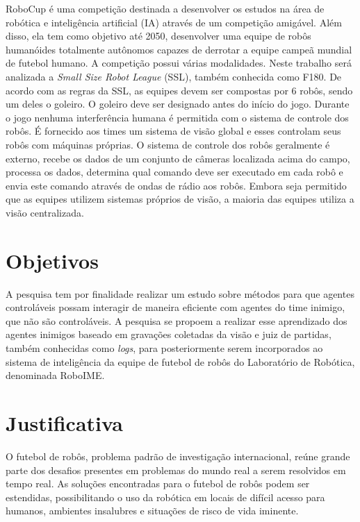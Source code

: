 RoboCup é uma competição destinada a desenvolver os estudos na área de robótica e
inteligência artificial (IA) através de um competição amigável. Além disso, ela tem
como objetivo até 2050, desenvolver uma equipe de robôs humanóides totalmente
autônomos capazes de derrotar a equipe campeã mundial de futebol humano. A competição
possui várias modalidades. Neste trabalho será analizada a \textit{Small Size Robot League} (SSL),
também conhecida como F180. De acordo com as regras da SSL, as equipes devem ser
compostas por 6 robôs, sendo um deles o goleiro. O goleiro deve ser
designado antes do início do jogo. Durante o jogo nenhuma interferência humana é
permitida com o sistema de controle dos robôs. É fornecido aos times um sistema de
visão global e esses controlam seus robôs com máquinas próprias. O sistema de controle
dos robôs geralmente é externo, recebe os dados de um conjunto de câmeras
localizada acima do campo, processa os dados, determina qual comando deve ser executado
em cada robô e envia este comando através de ondas de rádio aos robôs. Embora seja
permitido que as equipes utilizem sistemas próprios de visão, a maioria das equipes utiliza
a visão centralizada.

\section{Objetivos}

A pesquisa tem por finalidade realizar um estudo sobre métodos para que agentes controláveis
possam interagir de maneira eficiente com agentes do time inimigo, que não são controláveis.
A pesquisa se propoem a realizar esse aprendizado dos agentes inimigos baseado em gravações
coletadas da visão e juiz de partidas, também conhecidas como \textit{logs}, para posteriormente
serem incorporados ao sistema de inteligência da equipe de futebol de robôs do Laboratório
de Robótica, denominada RoboIME.

\section{Justificativa}

O futebol de robôs, problema padrão de investigação internacional, reúne grande parte
dos desafios presentes em problemas do mundo real a serem resolvidos em tempo real.
As soluções encontradas para o futebol de robôs podem ser estendidas, possibilitando
o uso da robótica em locais de difícil acesso para humanos, ambientes insalubres e
situações de risco de vida iminente.


